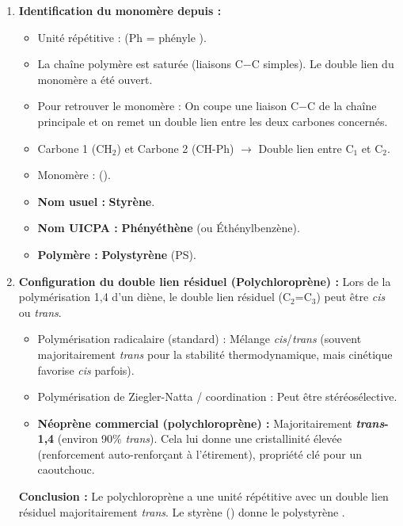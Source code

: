 \documentclass[11pt]{article}
\begin{document}
\begin{exoresolu}
\begin{enumerate}
    \item \textbf{Identification du monomère depuis  :}
    \begin{itemize}
        \item Unité répétitive :  (Ph = phényle ).
        \item La chaîne polymère est saturée (liaisons C$-$C simples). Le double lien du monomère a été ouvert.
        \item Pour retrouver le monomère : On coupe une liaison C$-$C de la chaîne principale et on remet un double lien entre les deux carbones concernés.
        \item Carbone 1 (CH$_2$) et Carbone 2 (CH-Ph) $\rightarrow$ Double lien entre C$_1$ et C$_2$.
        \item Monomère :  ().
        \item \textbf{Nom usuel :} \textbf{Styrène}.
        \item \textbf{Nom UICPA :} \textbf{Phényéthène} (ou Éthénylbenzène).
        \item \textbf{Polymère :} \textbf{Polystyrène} (PS).
    \end{itemize}

    \item \textbf{Configuration du double lien résiduel (Polychloroprène) :}
    Lors de la polymérisation 1,4 d'un diène, le double lien résiduel (C$_2$=C$_3$) peut être \textit{cis} ou \textit{trans}.
    \begin{itemize}
        \item Polymérisation radicalaire (standard) : Mélange \textit{cis}/\textit{trans} (souvent majoritairement \textit{trans} pour la stabilité thermodynamique, mais cinétique favorise \textit{cis} parfois).
        \item Polymérisation de Ziegler-Natta / coordination : Peut être stéréosélective.
        \item \textbf{Néoprène commercial (polychloroprène) :} Majoritairement \textbf{\textit{trans}-1,4} (environ 90\% \textit{trans}). Cela lui donne une cristallinité élevée (renforcement auto-renforçant à l'étirement), propriété clé pour un caoutchouc.
    \end{itemize}
    \textbf{Conclusion :} Le polychloroprène a une unité répétitive  avec un double lien résiduel majoritairement \textit{trans}. Le styrène () donne le polystyrène .
\end{enumerate}
\end{exoresolu}
\end{document}
